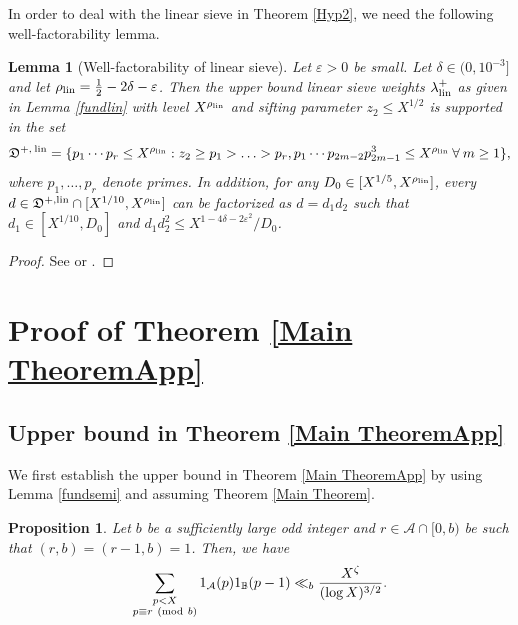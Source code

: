 \documentclass[12pt]{amsart}
\numberwithin{equation}{section}
\newtheorem{lemma}[theorem]{Lemma}
\newtheorem{prop}[theorem]{Proposition}
\theoremstyle{remark}
\theoremstyle{definition}
\newcommand{\imod}[1]{\ (\mathrm{mod}\ #1)}
\begin{document}
In order to deal with the linear sieve in Theorem \ref{Hyp2}, we need the following well-factorability lemma.

\begin{lemma}[Well-factorability of linear sieve]\label{wellfacclin}
Let $\varepsilon>0$ be small. Let $\delta\in (0, 10^{-3}]$  and let $\rho_{\textup{lin}}=\frac{1}{2}-2\delta-\varepsilon$. Then the upper bound linear sieve weights $\lambda_{\textup{lin}}^+$ as given in Lemma \ref{fundlin} with level $X^{\rho_{\textup{lin}}}$ and sifting parameter $z_2\leq X^{1/2}$ is supported in the set
\begin{align}
\mathfrak{D}^{+,\: \textup{lin}}=\{p_1\cdots p_r\leq X^{\rho_{\textup{lin}}}: z_2\geq p_1> \dotsc >p_r, p_1\cdots p_{2m-2}p_{2m-1}^3\leq X^{\rho_{\textup{lin}}}\: \forall \: m\geq 1\},
\end{align}
where $p_1, \dotsc, p_r$ denote primes. 
In addition, for any $D_0 \in [X^{1/5}, X^{\rho_{\textup{lin}}}]$,  every $d \in \mathfrak{D}^{+, \textup{lin}}\cap[X^{1/10}, X^{\rho_{\textup{lin}}}]$ can be factorized as $d=d_1d_2$ such that $d_1\in [X^{1/10}, D_0]$ and $d_1d_2^2\leq X^{1-4\delta-2\varepsilon^2}/D_0$. 
\end{lemma}
\begin{proof}
See \cite[Lemma 9.1]{Ter} or \cite[Lemma 12.16]{opera}.
\end{proof}

\section{Proof of Theorem \ref{Main TheoremApp}}\label{ThmappProof}

\subsection{Upper bound in Theorem \ref{Main TheoremApp}}
We first establish the upper bound in Theorem \ref{Main TheoremApp} by using Lemma \ref{fundsemi} and assuming Theorem \ref{Main Theorem}.
\begin{prop}\label{PropUpper}
Let $b$  be a sufficiently large odd integer and $r \in \mathcal{A}\cap[0, b)$ be such that $(r, b)=(r-1, b)=1$. Then, we have
\begin{align}
\notag \sum_{\substack{p<X\\p\equiv r\imod b}}1_{\mathcal{A}}(p)1_{\mathbb{B}}(p-1)\ll_{b} \dfrac{X^{\zeta}}{(\log X)^{3/2}}.
\end{align}
\end{prop}
\end{document}
